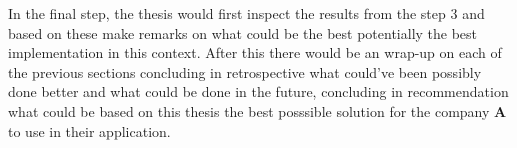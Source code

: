 \documentclass[article,11pt]{article}
\begin{document}
In the final step, the thesis would first inspect the results from the step 3 and based on these make remarks on what could be the best potentially the best implementation in this context. After this there would be an wrap-up on each of the previous sections concluding in retrospective what could've been possibly done better and what could be done in the future, concluding in recommendation what could be based on this thesis the best posssible solution for the company \textbf{A} to use in their application. 


\printbibliography
\end{document}

